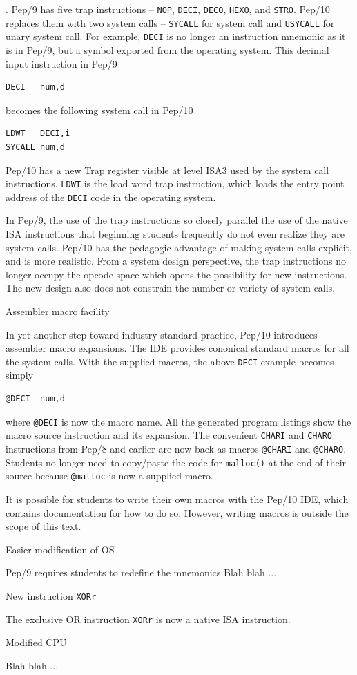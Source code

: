 \documentclass[10pt,fleqn]{book}
\newenvironment{exercises}
   {\begin{list}
      {\arabic{ecounter}.}
      {
         \usecounter{ecounter}
         \setcounter {ecounter}{0}
         \setlength\leftmargin{2pc}
         \setlength\labelwidth{6pc}
         \setlength\labelsep{1pc}
      }}
   {\end{list}}
\newcounter{ecounter}
\begin{document}
\begin{exercises}
Pep/9 has five trap instructions -- \verb|NOP|, \verb|DECI|, \verb|DECO|, \verb|HEXO|, and \verb|STRO|.
Pep/10 replaces them with two system calls -- \verb|SYCALL| for system call and \verb|USYCALL| for unary system call.
For example, \verb|DECI| is no longer an instruction mnemonic as it is in Pep/9, but a symbol exported from the operating system.
This decimal input instruction in Pep/9
\begin{verbatim}
DECI   num,d
\end{verbatim}
becomes the following system call in Pep/10
\begin{verbatim}
LDWT   DECI,i
SYCALL num,d
\end{verbatim}
Pep/10 has a new Trap register visible at level ISA3 used by the system call instructions.
\verb|LDWT| is the load word trap instruction, which loads the entry point address of the \verb|DECI| code in the operating system.

In Pep/9, the use of the trap instructions so closely parallel the use of the native ISA instructions that beginning students frequently do not even realize they are system calls.
Pep/10 has the pedagogic advantage of making system calls explicit, and is more realistic.
From a system design perspective, the trap instructions no longer occupy the opcode space which opens the possibility for new instructions.
The new design also does not constrain the number or variety of system calls.

\item Assembler macro facility

In yet another step toward industry standard practice, Pep/10 introduces assembler macro expansions.
The IDE provides cononical standard macros for all the system calls.
With the supplied macros, the above \verb|DECI| example becomes simply
\begin{verbatim}
@DECI  num,d
\end{verbatim}
where \verb|@DECI| is now the macro name.
All the generated program listings show the macro source instruction and its expansion.
The convenient \verb|CHARI| and \verb|CHARO| instructions from Pep/8 and earlier are now back as macros \verb|@CHARI| and \verb|@CHARO|.
Students no longer need to copy/paste the code for \verb|malloc()| at the end of their source because \verb|@malloc| is now a supplied macro.

It is possible for students to write their own macros with the Pep/10 IDE, which contains documentation for how to do so.
However, writing macros is outside the scope of this text.

\item Easier modification of OS

Pep/9 requires students to redefine the mnemonics Blah blah ...

\item New instruction \verb|XORr|

The exclusive OR instruction \verb|XORr| is now a native ISA instruction.

\item Modified CPU

Blah blah ...

\end{exercises}
\end{document}
